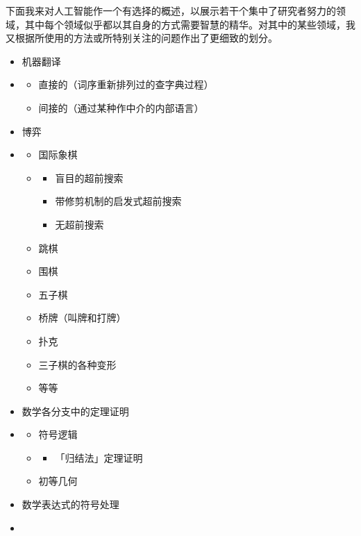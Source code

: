 \documentclass[
  12pt,
  twoside,
  openright,
  oldfontcommands,
]{memoir}
\providecommand{\tightlist}{%
  \setlength{\itemsep}{0pt}\setlength{\parskip}{0pt}}
\begin{document}
下面我来对人工智能作一个有选择的概述，以展示若干个集中了研究者努力的领域，其中每个领域似乎都以其自身的方式需要智慧的精华。对其中的某些领域，我又根据所使用的方法或所特别关注的问题作出了更细致的划分。

\begin{itemize}
\tightlist
\item
  机器翻译
\item
  \begin{itemize}
  \tightlist
  \item
    直接的（词序重新排列过的查字典过程）
  \item
    间接的（通过某种作中介的内部语言）
  \end{itemize}
\item
  博弈
\item
  \begin{itemize}
  \tightlist
  \item
    国际象棋
  \item
    \begin{itemize}
    \tightlist
    \item
      盲目的超前搜索
    \item
      带修剪机制的启发式超前搜索
    \item
      无超前搜索
    \end{itemize}
  \item
    跳棋
  \item
    围棋
  \item
    五子棋
  \item
    桥牌（叫牌和打牌）
  \item
    扑克
  \item
    三子棋的各种变形
  \item
    等等
  \end{itemize}
\item
  数学各分支中的定理证明
\item
  \begin{itemize}
  \tightlist
  \item
    符号逻辑
  \item
    \begin{itemize}
    \tightlist
    \item
      「归结法」定理证明
    \end{itemize}
  \item
    初等几何
  \end{itemize}
\item
  数学表达式的符号处理
\item
  \begin{itemize}

\end{itemize}
\end{itemize}
\end{document}
